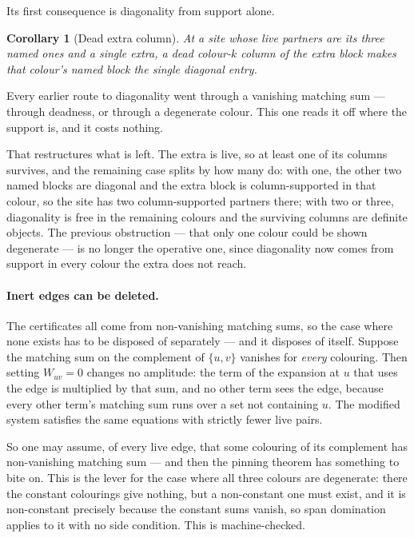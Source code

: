 \documentclass[11pt]{article}
\newtheorem{corollary}[theorem]{Corollary}
\theoremstyle{definition}
\theoremstyle{remark}
\begin{document}
Its first consequence is diagonality from support alone.

\begin{corollary}[Dead extra column]\label{cor:deadcol}
At a site whose live partners are its three named ones and a single extra, a dead colour-$k$
column of the extra block makes that colour's named block the single diagonal entry.
\end{corollary}

Every earlier route to diagonality went through a vanishing matching sum --- through deadness,
or through a degenerate colour. This one reads it off where the support is, and it costs
nothing.

That restructures what is left. The extra is live, so at least one of its columns survives, and
the remaining case splits by how many do: with one, the other two named blocks are diagonal and
the extra block is column-supported in that colour, so the site has two column-supported
partners there; with two or three, diagonality is free in the remaining colours and the
surviving columns are definite objects. The previous obstruction --- that only one colour could
be shown degenerate --- is no longer the operative one, since diagonality now comes from support
in every colour the extra does not reach.

\paragraph{Inert edges can be deleted.} The certificates all come from non-vanishing matching
sums, so the case where none exists has to be disposed of separately --- and it disposes of
itself. Suppose the matching sum on the complement of $\{u,v\}$ vanishes for \emph{every}
colouring. Then setting $W_{uv} = 0$ changes no amplitude: the term of the expansion at $u$
that uses the edge is multiplied by that sum, and no other term sees the edge, because every
other term's matching sum runs over a set not containing $u$. The modified system satisfies
the same equations with strictly fewer live pairs.

So one may assume, of every live edge, that some colouring of its complement has
non-vanishing matching sum --- and then the pinning theorem has something to bite on. This
is the lever for the case where all three colours are degenerate: there the constant
colourings give nothing, but a non-constant one must exist, and it is non-constant precisely
because the constant sums vanish, so span domination applies to it with no side condition.
This is machine-checked.
\end{document}
